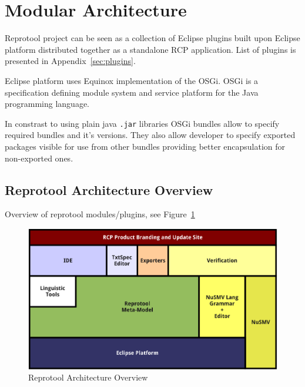 \section{Modular Architecture}
Reprotool project can be seen as a collection of Eclipse plugins built upon Eclipse platform distributed together as a standalone RCP application.
List of plugins is presented in Appendix~\ref{sec:plugins}.

Eclipse platform uses Equinox implementation of the OSGi. OSGi is a specification defining module system and service platform for the Java programming language.

In constrast to using plain java \verb|.jar| libraries OSGi bundles allow to specify required bundles and it's versions. They also allow developer to specify exported packages visible for use from other bundles providing better encapsulation for non-exported ones.

	


\subsection{Reprotool Architecture Overview}
Overview of reprotool modules/plugins, see Figure~\ref{fig:ArchitectureOverview}
	
\begin{figure}[ht]
  \centering
  \includegraphics[width=\textwidth]{images/ArchitectureOverview}
  \caption{Reprotool Architecture Overview}
  \label{fig:ArchitectureOverview}
\end{figure}

